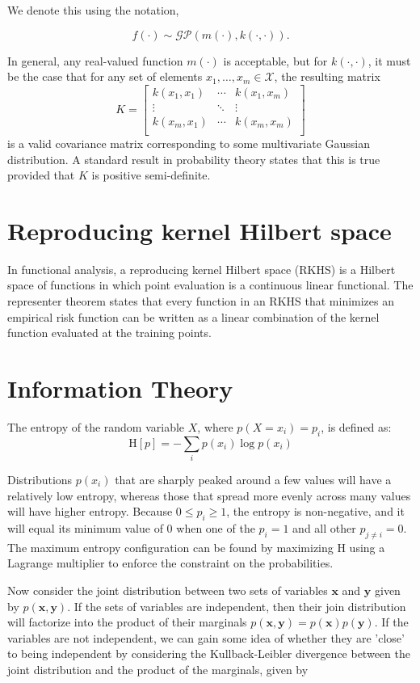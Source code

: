\documentclass{article}
\begin{document}
We denote this using the notation,

$$f(\cdot) \sim \mathcal{GP}(m(\cdot), k(\cdot, \cdot)).$$

In general, any real-valued function $m(\cdot)$ is acceptable, but for $k(\cdot, \cdot)$, it must be the case that for any set of elements $x_1, \dotsc, x_m \in \mathcal{X}$, the resulting matrix
$$K = \begin{bmatrix}
k(x_1, x_1) & \cdots & k(x_1, x_m) \\
\vdots & \ddots & \vdots\\
k(x_m, x_1) & \cdots & k(x_m, x_m) \\
\end{bmatrix} $$
is a valid covariance matrix corresponding to some multivariate
Gaussian distribution. A standard result in probability theory states
that this is true provided that $K$ is positive semi-definite.

\section{Reproducing kernel Hilbert space}
In functional analysis, a reproducing kernel Hilbert space (RKHS) is a
Hilbert space of functions in which point evaluation is a continuous
linear functional. The representer theorem states that every function
in an RKHS that minimizes an empirical risk function can be written as
a linear combination of the kernel function evaluated at the training
points.

\section{Information Theory}
The entropy of the random variable $X$, where $p(X = x_i) = p_i$, is
defined as:
\begin{equation} \label{eq:entropy}
  \mathrm{H}[p] = -\sum_{i}p(x_i)\log p(x_i)
\end{equation}

Distributions $p(x_i)$ that are sharply peaked around a few values
will have a relatively low entropy, whereas those that spread more
evenly across many values will have higher entropy. Because $0 \leq
p_i \geq 1$, the entropy is non-negative, and it will equal its
minimum value of 0 when one of the $p_i = 1$ and all other $p_{j \neq
  i} = 0$. The maximum entropy configuration can be found by
maximizing $\mathrm{H}$ using a Lagrange multiplier to enforce the
constraint on the probabilities.

Now consider the joint distribution between two sets of variables
$\mathbf{x}$ and $\mathbf{y}$ given by $p(\mathbf{x}, \mathbf{y})$. If
the sets of variables are independent, then their join distribution
will factorize into the product of their marginals $p(\mathbf{x},
\mathbf{y}) = p(\mathbf{x})p(\mathbf{y})$. If the variables are not
independent, we can gain some idea of whether they are 'close' to
being independent by considering the Kullback-Leibler divergence
between the joint distribution and the product of the marginals, given
by
\end{document}
